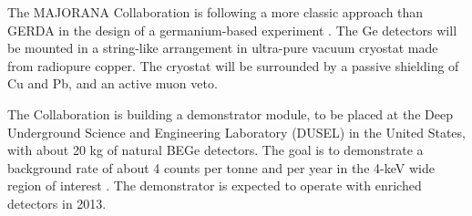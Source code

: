 The MAJORANA Collaboration is following a more classic approach than GERDA in the design of a germanium-based experiment \cite{Majorana:2011rit}. The Ge detectors will be mounted in a string-like arrangement in ultra-pure vacuum cryostat made from radiopure copper. The cryostat will be surrounded by a passive shielding of Cu and Pb, and an active muon veto.

The Collaboration is building a demonstrator module, to be placed at the Deep Underground Science and Engineering Laboratory (DUSEL) in the United States, with about 20 kg of natural BEGe detectors. The goal is to demonstrate a background rate of about 4 counts per tonne and per year in the 4-keV wide region of interest \cite{Majorana:2011vap}. The demonstrator is expected to operate with enriched detectors in 2013.
